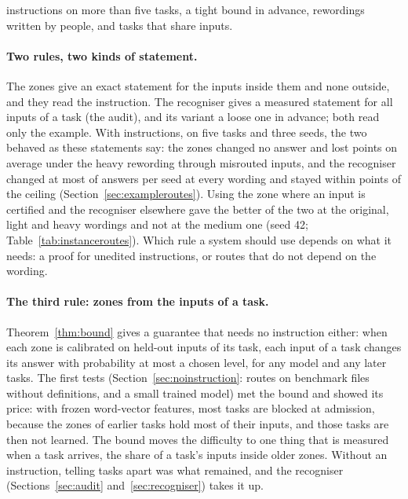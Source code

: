 instructions on more than five tasks, a tight bound in advance, rewordings written by people, and tasks that share inputs.

\paragraph{Two rules, two kinds of statement.} The zones give an exact statement for the inputs inside them and none outside, and they read the instruction. The recogniser gives a measured statement for all inputs of a task (the audit), and its variant \handicap{} a loose one in advance; both read only the example. With instructions, on five tasks and three seeds, the two behaved as these statements say: the zones changed no answer and lost \AudUThreeHeavyCertBelowOwn{} points on average under the heavy rewording through misrouted inputs, and the recogniser changed at most \AudUThreeMaxChangedPerSeed{} of \AudUCompared{} answers per seed at every wording and stayed within \AudUThreeRidgeBelowOwnHigh{} points of the ceiling (Section~\ref{sec:exampleroutes}). Using the zone where an input is certified and the recogniser elsewhere gave the better of the two at the original, light and heavy wordings and not at the medium one (seed 42; Table~\ref{tab:instanceroutes}). Which rule a system should use depends on what it needs: a proof for unedited instructions, or routes that do not depend on the wording.

\paragraph{The third rule: zones from the inputs of a task.} Theorem~\ref{thm:bound} gives a guarantee that needs no instruction either: when each zone is calibrated on held-out inputs of its task, each input of a task changes its answer with probability at most a chosen level, for any model and any later tasks. The first tests (Section~\ref{sec:noinstruction}: routes on benchmark files without definitions, and a small trained model) met the bound and showed its price: with frozen word-vector features, most tasks are blocked at admission, because the zones of earlier tasks hold most of their inputs, and those tasks are then not learned. The bound moves the difficulty to one thing that is measured when a task arrives, the share of a task's inputs inside older zones. Without an instruction, telling tasks apart was what remained, and the recogniser (Sections~\ref{sec:audit} and~\ref{sec:recogniser}) takes it up.

